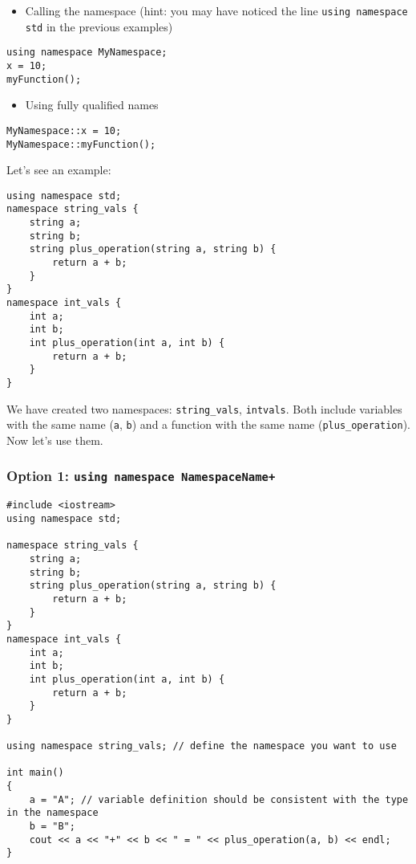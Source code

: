 \documentclass{article}
\begin{document}
\begin{itemize}
    \item Calling the namespace (hint: you may have noticed the line \verb|using namespace std| in the previous examples)
\end{itemize}

\begin{verbatim}
using namespace MyNamespace;
x = 10;
myFunction();
\end{verbatim}

\begin{itemize}
    \item Using fully qualified names
\end{itemize}

\begin{verbatim}
MyNamespace::x = 10;
MyNamespace::myFunction();
\end{verbatim}

Let's see an example:

\begin{verbatim}
using namespace std;
namespace string_vals {
    string a; 
    string b;  
    string plus_operation(string a, string b) {
        return a + b;
    }
}
namespace int_vals {
    int a; 
    int b; 
    int plus_operation(int a, int b) {
        return a + b;
    }
}
\end{verbatim}

We have created two namespaces: \verb|string_vals|, \verb|intvals|. Both include variables with the same name (\verb|a|, \verb|b|) and a function with the same name (\verb|plus_operation|). Now let's use them.

\subsubsection*{Option 1: \texttt{using namespace NamespaceName+}}
\begin{verbatim}
#include <iostream>
using namespace std;

namespace string_vals {
    string a; 
    string b;  
    string plus_operation(string a, string b) {
        return a + b;
    }
}
namespace int_vals {
    int a; 
    int b; 
    int plus_operation(int a, int b) {
        return a + b;
    }
}

using namespace string_vals; // define the namespace you want to use

int main()
{
    a = "A"; // variable definition should be consistent with the type in the namespace
    b = "B";
    cout << a << "+" << b << " = " << plus_operation(a, b) << endl;    
}
\end{verbatim}
\end{document}
